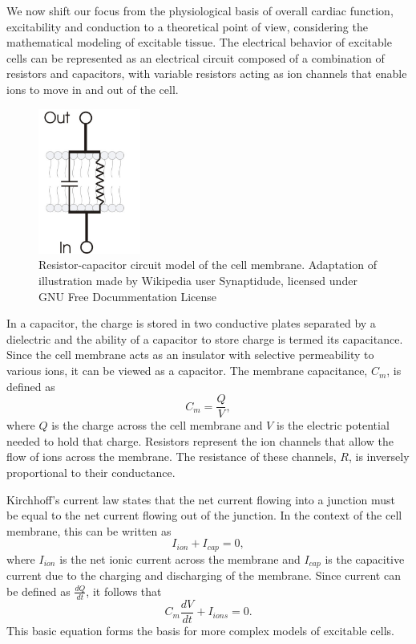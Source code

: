 We now shift our focus from the physiological basis of overall cardiac function, excitability and conduction to a theoretical point of view, considering the mathematical modeling of excitable tissue. The electrical behavior of excitable cells can be represented as an electrical circuit composed of a combination of resistors and capacitors, with variable resistors acting as ion channels that enable ions to move in and out of the cell.
\begin{figure}[H]
  \centering
  \includegraphics[width=0.3\textwidth]{Figs/RC_membrane_circuit.jpg}
  \caption{Resistor-capacitor circuit model of the cell membrane. Adaptation of illustration made by Wikipedia user Synaptidude, licensed under GNU Free Docummentation License}
  \label{fig: RC-membrane}
\end{figure}
In a capacitor, the charge is stored in two conductive plates separated by a dielectric and the ability of a capacitor to store charge is termed its capacitance. Since the cell membrane acts as an insulator with selective permeability to various ions, it can be viewed as a capacitor. The membrane capacitance, $C_m$, is defined as
\begin{equation}
    C_m = \frac{Q}{V},
    \label{eq:capacitance}
\end{equation}
where $Q$ is the charge across the cell membrane and $V$ is the electric potential needed to hold that charge.
Resistors represent the ion channels that allow the flow of ions across the membrane. The resistance of these channels, $R$, is inversely proportional to their conductance.

Kirchhoff's current law states that the net current flowing into a junction must be equal to the net current flowing out of the junction. In the context of the cell membrane, this can be written as
\begin{equation}
    I_{ion} + I_{cap}=0,
    \label{eq:KCL}
\end{equation}
where $I_{ion}$ is the net ionic current across the membrane and $I_{cap}$ is the capacitive current due to the charging and discharging of the membrane. Since current can be defined as $\frac{dQ}{dt}$, it follows that
\begin{equation}
    C_m\frac{dV}{dt} + I_{ions}=0.
    \label{eq:DE}
\end{equation}
This basic equation forms the basis for more complex models of excitable cells.







